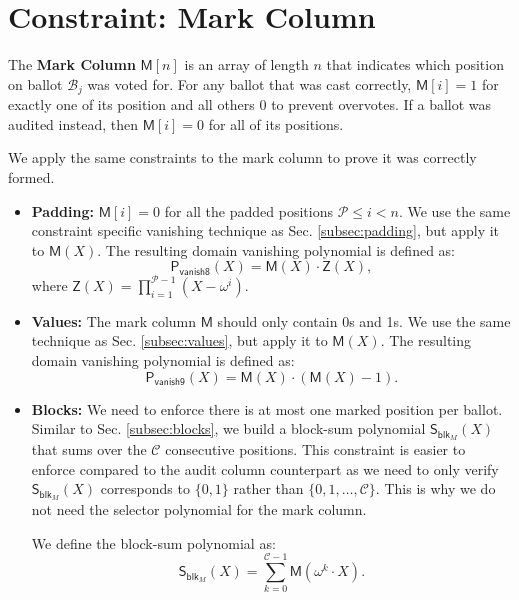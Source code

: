 \section{Constraint: Mark Column}
\label{sec:mark}
The \textbf{Mark Column} $\mathsf{M}[n]$ is an array of length $n$ that indicates which position on ballot $\mathcal{B}_j$ was voted for.  
For any ballot that was cast correctly, $\mathsf{M}[i]=1$ for exactly one of its position and all others $0$ to prevent overvotes. If a ballot was audited instead, then $\mathsf{M}[i]=0$ for all of its positions.

We apply the same constraints to the mark column to prove it was correctly formed. 

\begin{itemize}
  \item \textbf{Padding:} $\mathsf{M}[i]=0$ for all the padded positions $\mathcal{P}\le i< n$. We use the same constraint specific vanishing technique as Sec. \ref{subsec:padding}, but apply it to $\mathsf{M}(X)$. The resulting domain vanishing polynomial is defined as:
  \begin{equation}
    \label{eq:8}
  \mathsf{P_{vanish8}}(X) = \mathsf{M}(X)\cdot \mathsf{Z}(X),
  \end{equation}
  where $\mathsf{Z}(X) = \prod_{i=1}^{\mathcal{P}-1}(X-\omega^i).$
  \item \textbf{Values:} The mark column $\mathsf{M}$ should only contain 0s and 1s.
  We use the same technique as Sec. \ref{subsec:values}, but apply it to $\mathsf{M}(X)$. The resulting domain vanishing polynomial is defined as:
  \begin{equation}
    \label{eq:9}
    \mathsf{P_{vanish9}}(X) = \mathsf{M}(X)\cdot (\mathsf{M}(X)-1).
  \end{equation}
  \item \textbf{Blocks:} We need to enforce there is at most one marked position per ballot. 
  Similar to Sec. \ref{subsec:blocks}, we build a block-sum polynomial $\mathsf{S}_{\mathsf{blk}_M}(X)$ that sums over the $\mathcal{C}$ consecutive positions. 
  This constraint is easier to enforce compared to the audit column counterpart as we need to only verify $\mathsf{S}_{\mathsf{blk}_M}(X)$ corresponds to $\{0,1\}$ rather than $\{0,1,\dots,\mathcal{C}\}$. 
  This is why we do not need the selector polynomial for the mark column.

  We define the block-sum polynomial as:
\begin{equation}
    \label{eq:blk2}
  \mathsf{S}_{\mathsf{blk}_M}(X)= \sum_{k=0}^{\mathcal{C}-1} \mathsf{M}(\omega^k\cdot X). 
\end{equation}


\end{itemize}
